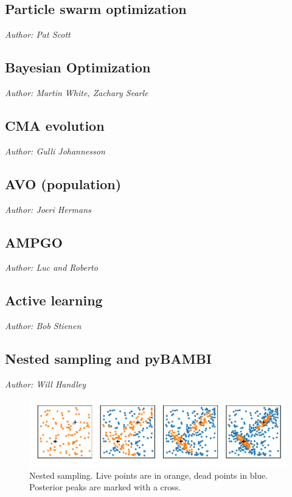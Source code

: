 \documentclass[11pt]{article}
\begin{document}
\subsection{Particle swarm optimization}
\emph{Author: Pat Scott}

\subsection{Bayesian Optimization}

\emph{Author: Martin White, Zachary Searle}

\subsection{CMA evolution}
\emph{Author: Gulli Johannesson}

\subsection{AVO (population)}
\emph{Author: Joeri Hermans}

\subsection{AMPGO}
\emph{Author: Luc and Roberto} 

\subsection{Active learning}
\emph{Author: Bob Stienen}

\subsection{Nested sampling and pyBAMBI}

\emph{Author: Will Handley}
\begin{figure}
    \centerline{%
        \includegraphics{nested_sampling.pdf}
    }
    \caption{Nested sampling. Live points are in orange, dead points in blue. Posterior peaks are marked with a cross.\label{fig:nested_sampling}}
\end{figure}
\end{document}
